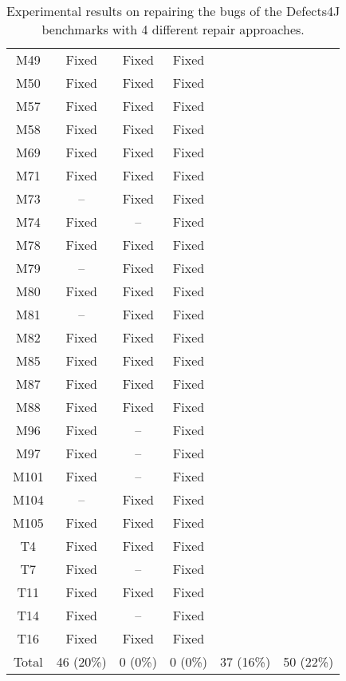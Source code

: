 \begin{table}[!t]
{\begin{tabular}{|c|c|c|c|c|c|}
M49               & Fixed     & Fixed     &Fixed   \\
M50               & Fixed     & Fixed     &Fixed   \\
M57               & Fixed     & Fixed     &Fixed   \\
M58               & Fixed     & Fixed     &Fixed   \\
M69               & Fixed     & Fixed     &Fixed   \\
M71               & Fixed     & Fixed     &Fixed   \\
M73               & --        & Fixed     &Fixed   \\
M74               & Fixed     & --        &Fixed   \\
M78               & Fixed     & Fixed     &Fixed   \\
M79               & --        & Fixed     &Fixed   \\
M80               & Fixed     & Fixed     &Fixed   \\
M81               & --        & Fixed     &Fixed   \\
M82               & Fixed     & Fixed     &Fixed   \\
M85               & Fixed     & Fixed     &Fixed   \\
M87               & Fixed     & Fixed     &Fixed   \\
M88               & Fixed     & Fixed     &Fixed   \\
M96               & Fixed     & --        &Fixed   \\
M97               & Fixed     & --        &Fixed   \\
M101              & Fixed     & --        &Fixed   \\
M104              & --        & Fixed     &Fixed   \\
M105              & Fixed     & Fixed     &Fixed   \\
\hline
T4                & Fixed     & Fixed     &Fixed   \\
T7                & Fixed     & --        &Fixed   \\
T11               & Fixed     & Fixed     &Fixed   \\
T14               & Fixed     & --        &Fixed   \\
T16               & Fixed     & Fixed     &Fixed   \\
\hline
Total             & 46 (20\%) & 0 (0\%)   & 0 (0\%)   & 37 (16\%) & 50 (22\%)\\
\hline 
\end{tabular}%
}
\caption{Experimental results on repairing the bugs of the Defects4J benchmarks with 4 different repair approaches.}
\end{table}
